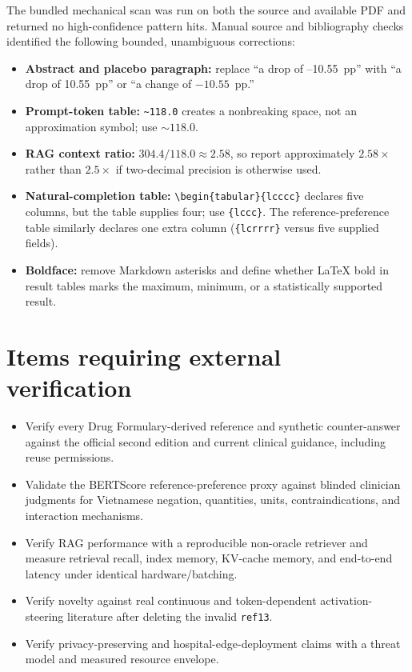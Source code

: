 \documentclass[11pt]{article}
\begin{document}
The bundled mechanical scan was run on both the source and available PDF and returned no high-confidence pattern hits.  Manual source and bibliography checks identified the following bounded, unambiguous corrections:
\begin{itemize}
    \item \textbf{Abstract and placebo paragraph:} replace ``a drop of --10.55~pp'' with ``a drop of 10.55~pp'' or ``a change of $-10.55$~pp.''
    \item \textbf{Prompt-token table:} \verb|~118.0| creates a nonbreaking space, not an approximation symbol; use $\sim118.0$.
    \item \textbf{RAG context ratio:} $304.4/118.0\approx2.58$, so report approximately $2.58\times$ rather than $2.5\times$ if two-decimal precision is otherwise used.
    \item \textbf{Natural-completion table:} \verb|\begin{tabular}{lcccc}| declares five columns, but the table supplies four; use \verb|{lccc}|.  The reference-preference table similarly declares one extra column (\verb|{lcrrrr}| versus five supplied fields).
    \item \textbf{Boldface:} remove Markdown asterisks and define whether LaTeX bold in result tables marks the maximum, minimum, or a statistically supported result.
\end{itemize}

\section*{Items requiring external verification}

\begin{itemize}
    \item Verify every Drug Formulary-derived reference and synthetic counter-answer against the official second edition and current clinical guidance, including reuse permissions.
    \item Validate the BERTScore reference-preference proxy against blinded clinician judgments for Vietnamese negation, quantities, units, contraindications, and interaction mechanisms.
    \item Verify RAG performance with a reproducible non-oracle retriever and measure retrieval recall, index memory, KV-cache memory, and end-to-end latency under identical hardware/batching.
    \item Verify novelty against real continuous and token-dependent activation-steering literature after deleting the invalid \texttt{ref13}.
    \item Verify privacy-preserving and hospital-edge-deployment claims with a threat model and measured resource envelope.
\end{itemize}
\end{document}
